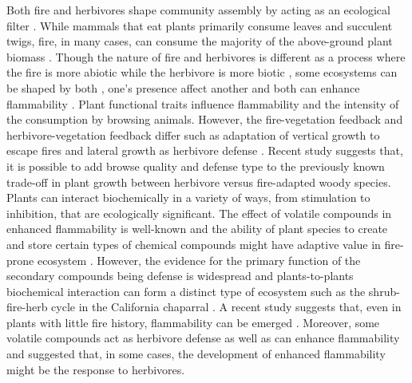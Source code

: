 \documentclass[12pt]{report}
\begin{document}
Both fire and herbivores shape community assembly by acting as an ecological filter \citep{belsky1992effects, grazingecologicalfilters, morphospace, verdu2007ecologicalfilter,fireecologicalfitlers}. While mammals that eat plants primarily consume leaves and succulent twigs, fire, in many cases, can consume the majority of the above-ground plant biomass \citep{bond1996fire,globalherbivore}. Though the nature of fire and herbivores is different as a process where the fire is more abiotic while the herbivore is more biotic  \citep{globalherbivore,archibald2019unified}, some ecosystems can be shaped by both \citep{van2003effects,  archibald2005shaping,staver2009browsing,donaldson2018ecological, noy1995interactive}, one's presence affect another\citep{holdo2009grazers, foster2015synergistic} and both can enhance flammability \citep{white1994monoterpenes, owens1998seasonal, Ulex}. Plant functional traits influence flammability and the intensity of the consumption by browsing animals. However, the fire-vegetation feedback and herbivore-vegetation feedback differ such as adaptation of vertical growth to escape fires and lateral growth as herbivore defense \citep{archibald2003growing,staver2012top,moncrieff2011tree}. Recent study \citep{wigley2015mammal} suggests that, it is possible to add browse quality and defense type to the previously known trade-off in plant growth between herbivore versus fire-adapted woody species.\\

Plants can interact biochemically in a variety of ways, from stimulation to inhibition, that are ecologically significant\citep{muller1966role}. The effect of volatile compounds in enhanced flammability is well-known \citep{mutch1970wildland,white1994monoterpenes,owens1998seasonal,volatile1,volatile2,volatile3,alam2020shoot,ormeno2009relationship} and the ability of plant species to create and store certain types of chemical compounds might have adaptive value in fire-prone ecosystem \citep{pausas2016secondary}. However, the evidence for the primary function of the secondary compounds being defense is widespread \citep{primaryfunction} and plants-to-plants biochemical interaction can form a distinct type of ecosystem such as the shrub-fire-herb cycle in the California chaparral \citep{allelopathic}. A recent study suggests that, even in plants with little fire history, flammability can be emerged \citep{cui2020shoot}. Moreover, some volatile compounds act as herbivore defense as well as can enhance flammability \citep{white1994monoterpenes} and \citep{owens1998seasonal} suggested that, in some cases, the development of enhanced flammability might be the response to herbivores.\\
\end{document}
